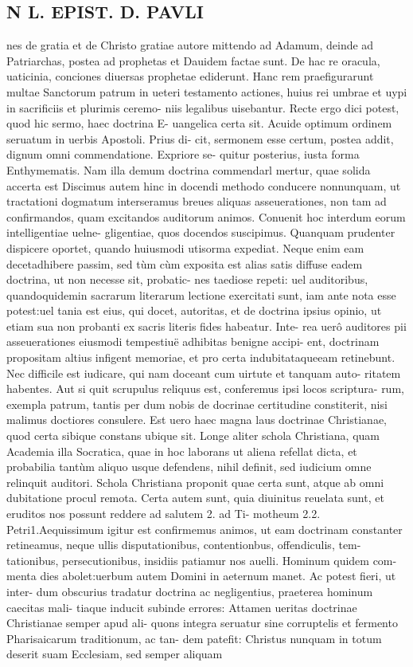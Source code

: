 \documentclass{article}
\begin{document}
\begin{pages}
\section*{N L. EPIST. D. PAVLI }
\marginpar{[ p.49 ]}\pstart nes de gratia et de Christo gratiae autore mittendo ad Adamum, deinde ad Patriarchas, postea ad prophetas et Dauidem factae sunt. De hac re oracula, uaticinia, conciones diuersas prophetae ediderunt. Hanc rem praefigurarunt multae Sanctorum patrum in ueteri testamento actiones, huius rei umbrae et uypi in sacrificiis et plurimis ceremo- niis legalibus uisebantur. Recte ergo dici potest, quod hic sermo, haec doctrina E- uangelica certa sit. Acuide optimum ordinem seruatum in uerbis Apostoli. Prius di- cit, sermonem esse certum, postea addit, dignum omni commendatione. Expriore se- quitur posterius, iusta forma Enthymematis. Nam illa demum doctrina commendarl mertur, quae solida accerta est  \pend\pstart Discimus autem hinc in docendi methodo conducere nonnunquam, ut tractationi dogmatum interseramus breues aliquas asseuerationes, non tam ad confirmandos, quam excitandos auditorum animos. Conuenit hoc interdum eorum intelligentiae uelne- gligentiae, quos docendos suscipimus. Quanquam prudenter dispicere oportet, quando huiusmodi utisorma expediat. Neque enim eam decetadhibere passim, sed tùm cùm exposita est alias satis diffuse eadem doctrina, ut non necesse sit, probatic- nes taediose repeti: uel auditoribus, quandoquidemin sacrarum literarum lectione exercitati sunt, iam ante nota esse potest:uel tania est eius, qui docet, autoritas, et de doctrina ipsius opinio, ut etiam sua non probanti ex sacris literis fides habeatur. Inte- rea uerô auditores pii asseuerationes eiusmodi tempestiuë adhibitas benigne accipi- ent, doctrinam propositam altius infigent memoriae, et pro certa indubitataqueeam retinebunt. Nec difficile est iudicare, qui nam doceant cum uirtute et tanquam auto- ritatem habentes. Aut si quit scrupulus reliquus est, conferemus ipsi locos scriptura- rum, exempla patrum, tantis per dum nobis de docrinae certitudine constiterit, nisi malimus doctiores consulere. Est uero haec magna laus doctrinae Christianae, quod certa sibique  constans ubique sit. Longe aliter schola Christiana, quam Academia illa Socratica, quae in hoc laborans ut aliena refellat dicta, et probabilia tantùm aliquo usque defendens, nihil definit, sed iudicium omne relinquit auditori. Schola Christiana proponit quae certa sunt, atque ab omni dubitatione procul remota. Certa autem sunt, quia diuinitus reuelata sunt, et eruditos nos possunt reddere ad salutem 2. ad Ti- motheum 2.2. Petri1.Aequissimum igitur est confirmemus animos, ut eam doctrinam constanter retineamus, neque ullis disputationibus, contentionbus, offendiculis, tem- tationibus, persecutionibus, insidiis patiamur nos auelli. Hominum quidem com- menta dies abolet:uerbum autem Domini in aeternum manet. Ac potest fieri, ut inter- dum obscurius tradatur doctrina ac negligentius, praeterea hominum caecitas mali- tiaque  inducit subinde errores: Attamen ueritas doctrinae Christianae semper apud ali- quons integra seruatur sine corruptelis et fermento Pharisaicarum traditionum, ac tan- dem patefit: Christus nunquam in totum deserit suam Ecclesiam, sed semper aliquam 
\end{pages}
\end{document}
